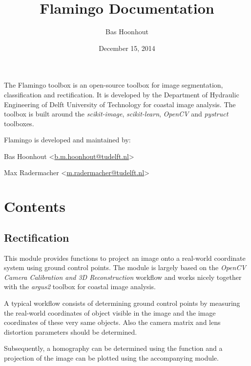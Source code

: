 \documentclass[letterpaper,10pt,english]{sphinxmanual}
\title{Flamingo Documentation}
\date{December 15, 2014}
\author{Bas Hoonhout}
\begin{document}
\maketitle
\tableofcontents
{}\label{index::doc}


The Flamingo toolbox is an open-source toolbox for image segmentation, classification and rectification.
It is developed by the Department of Hydraulic Engineering of Delft University of Technology for coastal image analysis.
The toolbox is built around the \emph{scikit-image}, \emph{scikit-learn}, \emph{OpenCV} and \emph{pystruct} toolboxes.

Flamingo is developed and maintained by:

\begin{DUlineblock}{0em}
\item[] Bas Hoonhout \textless{}\href{mailto:b.m.hoonhout@tudelft.nl}{b.m.hoonhout@tudelft.nl}\textgreater{}
\item[] Max Radermacher \textless{}\href{mailto:m.radermacher@tudelft.nl}{m.radermacher@tudelft.nl}\textgreater{}
\end{DUlineblock}


\chapter{Contents}
\label{index:contents}\label{index:welcome-to-flamingo-s-documentation}

\section{Rectification}
\label{rectification:rectification}\label{rectification::doc}
This module provides functions to project an image onto a
real-world coordinate system using ground control points. The
module is largely based on the \emph{OpenCV Camera Calibration and 3D
Reconstruction} workflow and works nicely together with the \emph{argus2}
toolbox for coastal image analysis.

A typical workflow consists of determining ground control points
by measuring the real-world coordinates of object visible in the
image and the image coordinates of these very same objects. Also
the camera matrix and lens distortion parameters should be
determined.

Subsequently, a homography can be determined using the
{\hyperref[rectification:flamingo.rectification.rectification.find_homography]{}} function and a projection of the image can be
plotted using the accompanying {\hyperref[rectification:module-flamingo.rectification.plot]{}} module.
\end{document}
